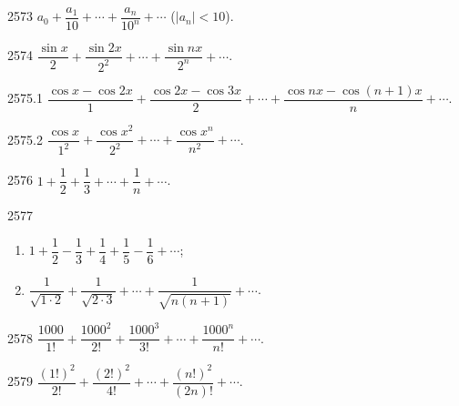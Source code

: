 
\begin{prob}[S]{2573}
$a_0 + \dfrac{a_1}{10} + \cdots + \dfrac{a_n}{10^n} + \cdots$ ($|a_n| < 10$).
\end{prob}

\begin{prob}[S]{2574}
$\dfrac{\sin x}{2} + \dfrac{\sin 2x}{2^2} + \cdots + \dfrac{\sin nx}{2^n} + \cdots$.
\end{prob}

\begin{prob}[S]{2575.1}
$\dfrac{\cos x - \cos 2x}{1} + \dfrac{\cos 2x - \cos 3x}{2} + \cdots + \dfrac{\cos nx - \cos(n+1)x}{n} + \cdots$.
\end{prob}

\begin{prob}[M]{2575.2}
$\dfrac{\cos x}{1^2} + \dfrac{\cos x^2}{2^2} + \cdots + \dfrac{\cos x^n}{n^2} + \cdots$.
\end{prob}


\begin{prob}[S]{2576}
$1 + \dfrac{1}{2} + \dfrac{1}{3} + \cdots + \dfrac{1}{n} + \cdots$.
\end{prob}

\begin{prob}[M]{2577}
\begin{enumerate}[label=(\alph*), itemsep=2pt, topsep=3pt]
  \item $1 + \dfrac{1}{2} - \dfrac{1}{3} + \dfrac{1}{4} + \dfrac{1}{5} - \dfrac{1}{6} + \cdots$;
  \item $\dfrac{1}{\sqrt{1 \cdot 2}} + \dfrac{1}{\sqrt{2 \cdot 3}} + \cdots + \dfrac{1}{\sqrt{n(n+1)}} + \cdots$.
\end{enumerate}
\end{prob}


\begin{prob}[S]{2578}
$\dfrac{1000}{1!} + \dfrac{1000^2}{2!} + \dfrac{1000^3}{3!} + \cdots + \dfrac{1000^n}{n!} + \cdots$.
\end{prob}

\begin{prob}[S]{2579}
$\dfrac{(1!)^2}{2!} + \dfrac{(2!)^2}{4!} + \cdots + \dfrac{(n!)^2}{(2n)!} + \cdots$.
\end{prob}

